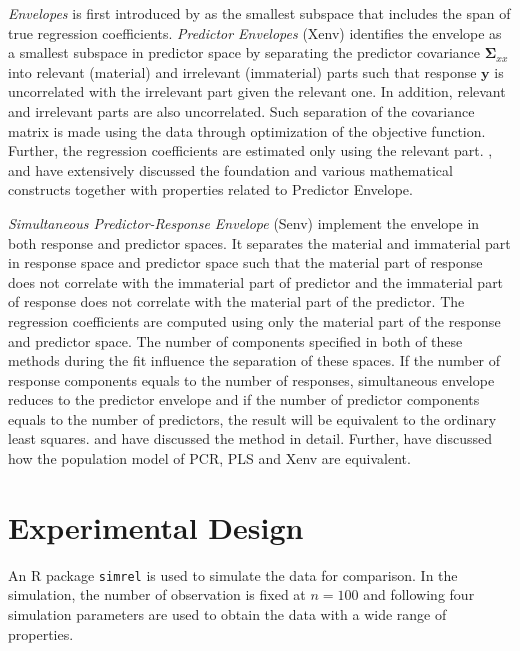 \documentclass[12pt,3p,authoryear]{elsarticle}
\begin{document}
\emph{Envelopes} is first introduced by \citep{Cook2007a} as the smallest subspace that includes the span of true regression coefficients. \emph{Predictor Envelopes} (Xenv) identifies the envelope as a smallest subspace in predictor space by separating the predictor covariance \(\boldsymbol{\Sigma}_{xx}\) into relevant (material) and irrelevant (immaterial) parts such that response \(\mathbf{y}\) is uncorrelated with the irrelevant part given the relevant one. In addition, relevant and irrelevant parts are also uncorrelated. Such separation of the covariance matrix is made using the data through optimization of the objective function. Further, the regression coefficients are estimated only using the relevant part. \citet{cook2010envelope}, \citet{cook2013envelopes} and \citet{cook2018envelope} have extensively discussed the foundation and various mathematical constructs together with properties related to Predictor Envelope.

\emph{Simultaneous Predictor-Response Envelope} (Senv) implement the envelope in both response and predictor spaces. It separates the material and immaterial part in response space and predictor space such that the material part of response does not correlate with the immaterial part of predictor and the immaterial part of response does not correlate with the material part of the predictor. The regression coefficients are computed using only the material part of the response and predictor space. The number of components specified in both of these methods during the fit influence the separation of these spaces. If the number of response components equals to the number of responses, simultaneous envelope reduces to the predictor envelope and if the number of predictor components equals to the number of predictors, the result will be equivalent to the ordinary least squares. \citet{cook2015simultaneous} and \citet{cook2018envelope} have discussed the method in detail. Further, \citet{helland2016algorithms} have discussed how the population model of PCR, PLS and Xenv are equivalent.

\hypertarget{experimental-design}{%
\section{Experimental Design}\label{experimental-design}}

An R \citep{coreR2018} package \texttt{simrel} \citep{Rimal2018, saebo2015simrel} is used to simulate the data for comparison. In the simulation, the number of observation is fixed at \(n = 100\) and following four simulation parameters are used to obtain the data with a wide range of properties.
\end{document}
